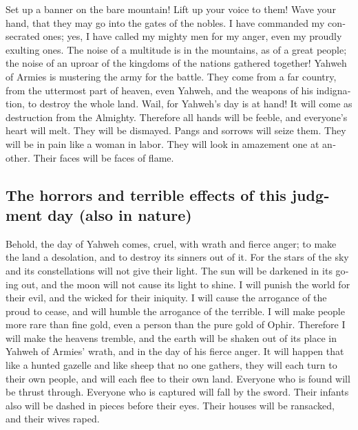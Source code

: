 \begin{paracol}{2}
\begin{otherlanguage}{english}
 Set up a banner on the bare mountain! Lift up your voice
to them! Wave your hand, that they may go into the gates of the nobles.
 I have commanded my consecrated ones; yes, I have called
my mighty men for my anger, even my proudly exulting ones.
 The noise of a multitude is in the mountains, as of a
great people; the noise of an uproar of the kingdoms of the nations
gathered together! Yahweh of Armies is mustering the army for the
battle.  They come from a far country, from the uttermost
part of heaven, even Yahweh, and the weapons of his indignation, to
destroy the whole land.  Wail, for Yahweh's day is at
hand! It will come as destruction from the Almighty. 
Therefore all hands will be feeble, and everyone's heart will melt.
 They will be dismayed. Pangs and sorrows will seize them.
They will be in pain like a woman in labor. They will look in amazement
one at another. Their faces will be faces of flame.

\hypertarget{the-horrors-and-terrible-effects-of-this-judgment-day-also-in-nature}{%
\subsection{The horrors and terrible effects of this judgment day (also
in
nature)}\label{the-horrors-and-terrible-effects-of-this-judgment-day-also-in-nature}}

 Behold, the day of Yahweh comes, cruel, with wrath and
fierce anger; to make the land a desolation, and to destroy its sinners
out of it.  For the stars of the sky and its
constellations will not give their light. The sun will be darkened in
its going out, and the moon will not cause its light to shine.
 I will punish the world for their evil, and the wicked
for their iniquity. I will cause the arrogance of the proud to cease,
and will humble the arrogance of the terrible.  I will
make people more rare than fine gold, even a person than the pure gold
of Ophir.  Therefore I will make the heavens tremble, and
the earth will be shaken out of its place in Yahweh of Armies' wrath,
and in the day of his fierce anger.  It will happen that
like a hunted gazelle and like sheep that no one gathers, they will each
turn to their own people, and will each flee to their own land.
 Everyone who is found will be thrust through. Everyone
who is captured will fall by the sword.  Their infants
also will be dashed in pieces before their eyes. Their houses will be
ransacked, and their wives raped.


\end{otherlanguage}
\end{paracol}
